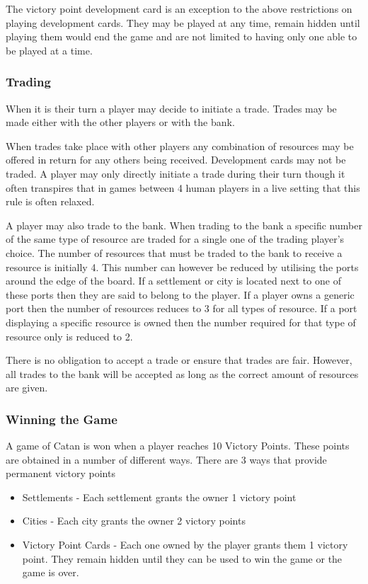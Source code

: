 \documentclass[]{article}
\begin{document}
\par The victory point development card is an exception to the above restrictions on playing development cards. They may be played at any time, remain hidden until playing them would end the game and are not limited to having only one able to be played at a time.

\subsubsection{Trading}
When it is their turn a player may decide to initiate a trade. Trades may be made either with the other players or with the bank.

\par When trades take place with other players any combination of resources may be offered in return for any others being received. Development cards may not be traded. A player may only directly initiate a trade during their turn though it often transpires that in games between 4 human players in a live setting that this rule is often relaxed.

\par A player may also trade to the bank. When trading to the bank a specific number of the same type of resource are traded for a single one of the trading player's choice. The number of resources that must be traded to the bank to receive a resource is initially 4. This number can however be reduced by utilising the ports around the edge of the board. If a settlement or city is located next to one of these ports then they are said to belong to the player. If a player owns a generic port then the number of resources reduces to 3 for all types of resource. If a port displaying a specific resource is owned then the number required for that type of resource only is reduced to 2.

\par There is no obligation to accept a trade or ensure that trades are fair. However, all trades to the bank will be accepted as long as the correct amount of resources are given.


\subsubsection{Winning the Game}
A game of Catan is won when a player reaches 10 Victory Points. These points are obtained in a number of different ways. There are 3 ways that provide permanent victory points

\begin{itemize}
	\item Settlements - Each settlement grants the owner 1 victory point
	\item Cities - Each city grants the owner 2 victory points
	\item Victory Point Cards - Each one owned by the player grants them 1 victory point. They remain hidden until they can be used to win the game or the game is over.
\end{itemize}
\end{document}
